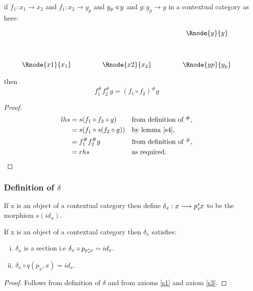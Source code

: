 \documentclass[10pt,a4paper]{scrartcl}
\renewcommand{\sub}{^*\kern-1pt}
\newcommand{\hash}{^\#}
\begin{document}
\begin{lemma}
\label{lemmahash2}
if $f_1:x_1 \longrightarrow x_2$ and $f_1:x_2 \longrightarrow y_p$
and $y_p \triangleleft y$ and  $g:y_p \longrightarrow y$ in a contextual category  as here:

\vspace{3mm}
\begin{center}
\begin{displaymath}
\begin{array}{cp{.9cm}cp{.9cm}c}
 & & & &\Rnode{y}{y}\\ [1.2cm]
\Rnode{x1}{x_1}         & & \Rnode{x2}{x_2}         & & \Rnode{yp}{y_p}
\end{array}
\end{displaymath}
\end{center}

then
\begin{equation*}
f_1 \hash f_2 \hash g = (f_1 \circ f_2) \hash g
\end{equation*}
\end{lemma}
\begin{proof}
\begin{align*}
lhs &= s(f_1 \circ f_2 \circ g)     && \mbox{from definition of  $\hash$,} \\
    &= s(f_1 \circ s(f_2 \circ g))  && \mbox{by lemma \ref{s4},}           \\
		&= f_1 \hash f_2 \hash g    && \mbox{from definition of $\hash$,}  \\
	  &= rhs                        && \mbox{as required.}
\end{align*}
\end{proof}


\subsubsection {Definition of $\delta$}

If x is an object of a contextual category  then define $\delta_x: x \longrightarrow p_x \sub x$ to be
the morphism $s(id_x)$.

\begin{lemma}
\label {deltalemma}
If x is an object of a contextual category  then $\delta_x$ satisfies:
\begin{enumerate}[(i)]
\item $\delta_x$ is a section i.e $\delta_x \circ p_{p_x \sub x} = id_x$.
\item $\delta_x \circ q(p_x,x) = id_x$.
\end{enumerate}
\end{lemma}
\begin{proof}
Follows from definition of $\delta$ and from axioms \ref{s1} and axiom \ref{s3}.
\end{proof}
\end{document}
